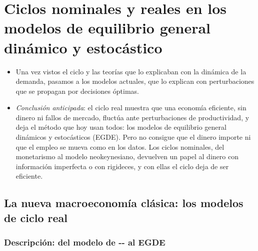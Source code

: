 \documentclass[11pt]{article}
\begin{document}
\section{Ciclos nominales y reales en los modelos\cortetitulo{} de equilibrio general dinámico y estocástico}\label{sec:nominales-reales}

\begin{itemize}
\item Una vez vistos el ciclo y las teorías que lo explicaban con la dinámica de la demanda, pasamos a los modelos actuales, que lo explican con perturbaciones que se propagan por decisiones óptimas.
\item \emph{Conclusión anticipada}: el ciclo real muestra que una economía eficiente, sin dinero ni fallos de mercado, fluctúa ante perturbaciones de productividad, y deja el método que hoy usan todos: los modelos de equilibrio general dinámicos y estocásticos (EGDE). Pero no consigue que el dinero importe ni que el empleo se mueva como en los datos. Los ciclos nominales, del monetarismo al modelo neokeynesiano, devuelven un papel al dinero con información imperfecta o con rigideces, y con ellas el ciclo deja de ser eficiente.
\end{itemize}

\subsection{La nueva macroeconomía clásica: los modelos de ciclo real}\label{sec:nmc}

\subsubsection{Descripción: del modelo de -- al EGDE}\label{sec:rbc-descripcion}
\end{document}
